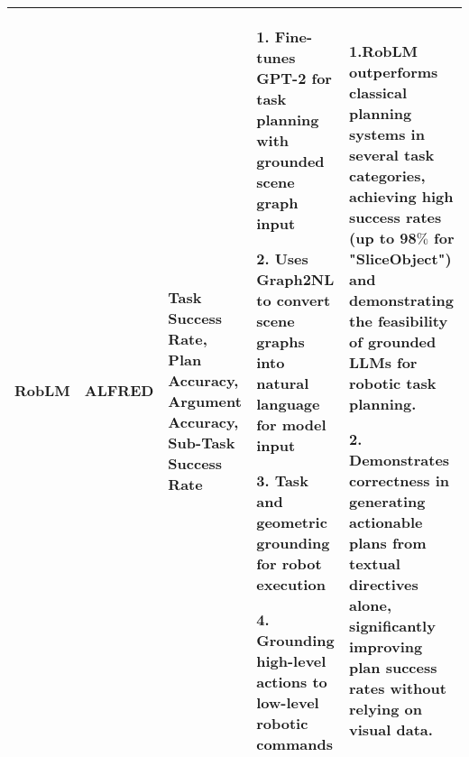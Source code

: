 \begin{table*}[!h]
{\begin{tabular}{|p{2.8cm}|p{2.2cm}|p{3.0cm}|p{5.5cm}|p{6.0cm}|}
\hline 
RobLM \par \cite{chalvatzaki2023learning} & ALFRED & Task Success Rate, Plan Accuracy, Argument Accuracy, Sub-Task Success Rate & 1. Fine-tunes GPT-2 for task planning with grounded scene graph input \par  2. Uses Graph2NL to convert scene graphs into natural language for model input \par 3. Task and geometric grounding for robot execution \par 4. Grounding high-level actions to low-level robotic commands & 1.RobLM outperforms classical planning systems in several task categories, achieving high success rates (up to 98$\%$ for "SliceObject") and demonstrating the feasibility of grounded LLMs for robotic task planning. \par 2. Demonstrates correctness in generating actionable plans from textual directives alone, significantly improving plan success rates without relying on visual data.\\



\hline

\end{tabular}
}
\label{tab:foundation_2}
\end{table*}

